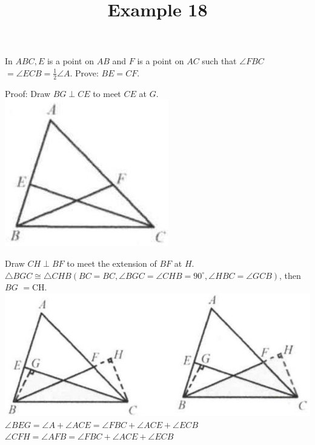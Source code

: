 \documentclass{article}
\title{Example 18}
\date{}
\begin{document}
\maketitle

In \(A B C, E\) is a point on \(A B\) and \(F\) is a point on \(A C\) such that \(\angle F B C\) \(=\angle E C B=\frac{1}{2} \angle A\). Prove: \(B E=C F\).

Proof:
Draw \(B G \perp C E\) to meet \(C E\) at \(G\).\\
\centering
\includegraphics[width=\textwidth]{images/085(2).jpg}

Draw \(C H \perp B F\) to meet the extension of \(B F\) at \(H\).\\
\(\triangle B G C \cong \triangle C H B\left(B C=B C, \angle B G C=\angle C H B=90^{\circ}, \angle H B C=\angle G C B\right)\), then \(B G\) \(=\mathrm{CH}\).\\
\centering
\includegraphics[width=\textwidth]{images/085(1).jpg}\\
\(\angle B E G=\angle A+\angle A C E=\angle F B C+\angle A C E+\angle E C B\)\\
\(\angle C F H=\angle A F B=\angle F B C+\angle A C E+\angle E C B\)
\end{document}
